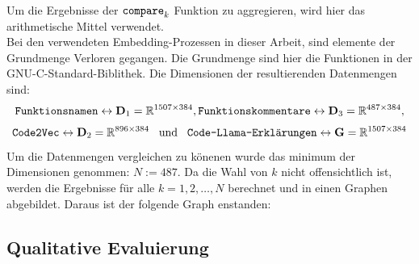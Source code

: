 \documentclass[12pt,letterpaper,ngerman]{article}
\begin{document}
Um die Ergebnisse der $\verb|compare|_k$ Funktion zu aggregieren, wird hier das 
arithmetische Mittel verwendet.\\
Bei den verwendeten Embedding-Prozessen in dieser Arbeit, sind elemente der Grundmenge 
Verloren gegangen. Die Grundmenge sind hier die Funktionen in der GNU-C-Standard-Biblithek.
Die Dimensionen der resultierenden Datenmengen sind: 
\[
  \verb|Funktionsnamen| \leftrightarrow \mathbf{D}_1=\mathbb{R}^{1507\times 384},
  \verb|Funktionskommentare| \leftrightarrow \mathbf{D}_3=\mathbb{R}^{487\times 384},
\]
\[ 
  \verb|Code2Vec| \leftrightarrow \mathbf{D}_2=\mathbb{R}^{896\times 384} \hspace{0.3cm}\text{und}
  \hspace{0.3cm} \verb|Code-Llama-Erklärungen| \leftrightarrow \mathbf{G}=\mathbb{R}^{1507\times 384}
\]
Um die Datenmengen vergleichen zu könenen wurde das minimum der Dimensionen genommen: 
$N := 487$.
Da die Wahl von $k$ nicht offensichtlich ist, werden die Ergebnisse für alle $k = 1, 2, \dots, N$
berechnet und in einen Graphen abgebildet. Daraus ist der folgende Graph enstanden:
\subsection{Qualitative Evaluierung} 
\end{document}
